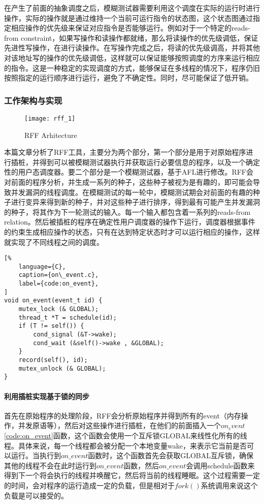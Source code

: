 在产生了前面的抽象调度之后，模糊测试器需要利用这个调度在实际的运行时进行操作，实际的操作就是通过维持一个当前可运行指令的状态图，这个状态图通过指定相应操作的优先级来保证对应指令是否能够运行。例如对于一个特定的reads-from constraint，如果写操作和读操作都就绪，那么将读操作的优先级调低，保证先进性写操作，在进行读操作。在写操作完成之后，将读的优先级调高，并将其他对该地址写的操作的优先级调低，这样就可以保证能够按照调度的方序来运行相应的指令。这是一种稳定的实现调度的方式，能够保证在多线程的情况下，程序仍旧按照指定的运行顺序进行运行，避免了不确定性。同时，尽可能保证了低开销。

\subsubsection{工作架构与实现}

\begin{figure}[ht]
    \centering
    \texttt{[image: rff\_1]}
    \caption{\label{fig:rff}RFF Arhitecture}
\end{figure}

本篇文章分析了RFF工具，主要分为两个部分，第一个部分是用于对原始程序进行插桩，并得到可以被模糊测试器执行并获取运行必要信息的程序，以及一个确定性的用户态调度器。要二个部分是一个模糊测试器，基于AFL进行修改。RFF会对前面的程序分析，并生成一系列的种子，这些种子被视为是有趣的，即可能会导致并发漏洞的线程调度。在模糊测试的每一轮中，模糊测试期会对前面的有趣的种子进行变异来得到新的种子，并对这些种子进行排序，得到最有可能产生并发漏洞的种子，将其作为下一轮测试的输入。每一个输入都包含着一系列的reads-from relation。然后被插桩的程序在确定性用户调度器的操作下运行，调度器根据事件的约束生成相应操作的状态，只有在达到特定状态时才可以运行相应的操作，这样就实现了不同线程之间的调度。

\begin{spacing}{1.0}
\begin{lstlisting}[%
    language={C},
    caption={on\_event.c},
    label={code:on_event},
]
void on_event(event_t id) {
    mutex_lock (& GLOBAL);
    thread_t *T = schedule(id);
    if (T != self()) {
        cond_signal (&T->wake);
        cond_wait (&self()->wake , &GLOBAL);
    }
    record(self(), id);
    mutex_unlock (& GLOBAL);
}
\end{lstlisting}
\end{spacing}

\paragraph{利用插桩实现基于锁的同步}首先在原始程序的处理阶段，RFF会分析原始程序并得到所有的event（内存操作，并发原语等），然后对这些操作进行插桩，在他们的前面插入一个$on_event$\autoref{code:on_event}函数，这个函数会使用一个互斥锁GLOBAL来线性化所有的线程。具体来说，每一个线程都会被分配一个本地变量wake，来表示它当前是否可以运行。当执行到$on\_event$函数时，这个函数首先会获取GLOBAL互斥锁，确保其他的线程不会在此时运行到$on\_event$函数，然后$on\_event$会调用schedule函数来得到下一个将会执行的线程并唤醒它，然后将当前的线程睡眠。这个过程需要一定的时间，会对程序的运行造成一定的负载，但是相对于$fork()$系统调用来说这个负载是可以接受的\cite{ba2022efficient, gao2021scalable, jeon2020fuzzan}。

